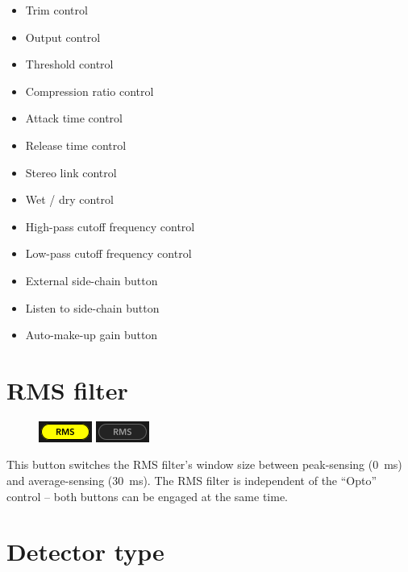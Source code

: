 \begin{itemize}
\item Trim control
\item Output control

\item Threshold control
\item Compression ratio control

\item Attack time control
\item Release time control

\item Stereo link control
\item Wet / dry control

\item High-pass cutoff frequency control
\item Low-pass cutoff frequency control

\item External side-chain button
\item Listen to side-chain button

\item Auto-make-up gain button
\end{itemize}

\section{RMS filter}

\begin{figure}
  \includegraphics[scale=\screenshotscale,clip]{include/images/button_rms_on.png}
  \newline \vspace{-0.9\baselineskip}
  \includegraphics[scale=\screenshotscale,clip]{include/images/button_rms_off.png}
\end{figure}

This button switches the RMS filter's window size between peak-sensing
(\SI{0}{\milli\second}) and average-sensing (\SI{30}{\milli\second}).
The RMS filter is independent of the ``Opto'' control -- both buttons
can be engaged at the same time.

\section{Detector type}


